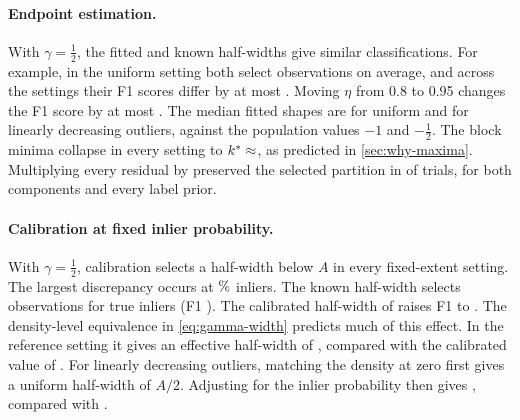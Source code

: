 \documentclass[10pt,twocolumn,letterpaper]{article}
\begin{document}
\paragraph{Endpoint estimation.}
With $\gamma=\tfrac12$, the fitted and known half-widths give similar classifications. For example, in the uniform setting both select
 observations on average, and
across the \SynNumCases{} settings their F1 scores differ by at most
\SynMaxGapKnownEV. Moving $\eta$ from 0.8 to 0.95 changes the F1 score by at
most \SynMaxGapEta. The
median fitted shapes are  for
uniform and  for linearly decreasing
outliers, against the population values $-1$ and $-\tfrac12$. The block
minima collapse in every setting to
$k^*\approx\syn{uniform}{half}{block_min20-uniform}{k}$, as predicted in
\cref{sec:why-maxima}. Multiplying every residual by \SynInvScale{}
preserved the selected partition in \SynInvIdentical{} of
\SynInvTrials{} trials, for both components and every label prior.

\paragraph{Calibration at fixed inlier probability.}
With $\gamma=\tfrac12$, calibration selects a half-width below $A$ in
every fixed-extent setting. The largest discrepancy occurs at
$\syncase{uniform_3pct}{percent}\%$ inliers. The known half-width selects
 observations for
 true inliers (F1
). The calibrated half-width
of  raises F1 to
. The density-level
equivalence in \cref{eq:gamma-width} predicts much of this effect.
In the reference setting it gives an effective half-width of
, compared with the calibrated value of
. For linearly
decreasing outliers, matching the density at zero first gives a uniform
half-width of $A/2$. Adjusting for the inlier probability then gives
, compared with
.
\end{document}
